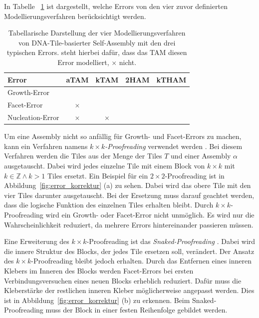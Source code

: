 In Tabelle ~\ref{tab:errors} ist dargestellt, welche Errors von den vier zuvor definierten Modellierungsverfahren berücksichtigt werden.

\begin{table}
	\centering
	\begin{tabular}{lcccc}
		\hline\textbf{Error} & \textbf{aTAM} & \textbf{kTAM} & \textbf{2HAM} & \textbf{kTHAM} \\\hline
		Growth-Error & \checkmark & \checkmark & \checkmark & \checkmark\\
		Facet-Error & $\times$ & \checkmark & \checkmark & \checkmark\\
		Nucleation-Error & $\times$ & $\times$ & \checkmark & \checkmark\\\hline
	\end{tabular}
	\caption[Self-Assembly Errors]{Tabellarische Darstellung der vier Modellierungsverfahren von DNA-Tile-basierter Self-Assembly mit den drei typischen Errors. \checkmark steht hierbei dafür, dass das TAM diesen Error modelliert, $\times$ nicht.}
	\label{tab:errors}
\end{table}

Um eine Assembly nicht so anfällig für Growth- und Facet-Errors zu machen, kann ein Verfahren namens \emph{$k\times k$-Proofreading} verwendet werden \cite{winfree2004kxk,chen2005kxk}.
Bei diesem Verfahren werden die Tiles aus der Menge der Tiles $T$ und einer Assembly $\alpha$ ausgetauscht. 
Dabei wird jedes einzelne Tile mit einem Block von $k \times k$ mit $k\in\mathbb{Z} \land k > 1$ Tiles ersetzt. 
Ein Beispiel für ein $2 \times 2$-Proofreading ist in Abbildung~\ref{fig:error_korrektur} (a) zu sehen. 
Dabei wird das obere Tile mit den vier Tiles darunter ausgetauscht. Bei der Ersetzung muss darauf geachtet werden, dass die logische Funktion des einzelnen Tiles erhalten bleibt. 
Durch $k \times k$-Proofreading wird ein Growth- oder Facet-Error nicht unmöglich. Es wird nur die Wahrscheinlichkeit reduziert, da mehrere Errors hintereinander passieren müssen.

Eine Erweiterung des $k \times k$-Proofreading ist das \emph  {Snaked-Proofreading} \cite{chen2005kxk}.
Dabei wird die innere Struktur des Blocks, der jedes Tile ersetzen soll, verändert.
Der Ansatz des $k\times k$-Proofreading bleibt jedoch erhalten. 
Durch das Entfernen eines inneren Klebers im Inneren des Blocks werden Facet-Errors bei ersten Verbindungsversuchen eines neuen Blocks erheblich reduziert. 
Dafür muss die Kleberstärke der restlichen inneren Kleber möglicherweise angepasst werden.
Dies ist in Abbildung~\ref{fig:error_korrektur} (b) zu erkennen. 
Beim Snaked-Proofreading muss der Block in einer festen Reihenfolge gebildet werden.

